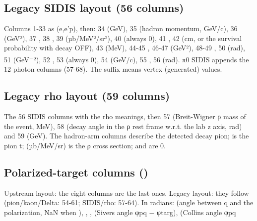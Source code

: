 \subsection{\texorpdfstring{Legacy SIDIS layout (56 columns)}{Legacy SIDIS layout (56 columns)}}\label{user_manual-07u5foutputs:716-legacy-sidis-layout-56-columns}
Columns 1-33 as (e,e'p), then: 34  (GeV), 35  (hadron momentum, GeV/c), 36  (GeV²), 37 , 38
, 39  (µb/\allowbreak{}MeV²/\allowbreak{}sr²),\allowbreak{} 40  (always 0), 41 , 42  (cm, or the survival probability
with decay OFF), 43  (MeV), 44-45 , 46-47  (GeV²), 48-49 , 50  (rad), 51 
(GeV\textsuperscript{−}²),\allowbreak{} 52 , 53  (always 0), 54  (GeV/c), 55 , 56  (rad). π0 SIDIS appends the 12 photon columns (57-68). The 
suffix means vertex (generated) values.

\subsection{\texorpdfstring{Legacy rho layout (59 columns)}{Legacy rho layout (59 columns)}}\label{user_manual-07u5foutputs:717-legacy-rho-layout-59-columns}
The 56 SIDIS columns with the rho meanings, then 57  (Breit-Wigner ρ mass of the event, MeV), 58  (decay
angle in the ρ rest frame w.r.t. the lab z axis, rad) and 59  (GeV). The hadron-arm columns describe the detected
decay pion;  is the pion t;  (µb/MeV/sr) is the ρ cross section;  and  are 0.

\subsection{\texorpdfstring{Polarized-target columns ()}{Polarized-target columns (using\_\allowbreak{}tgt\_\allowbreak{}field)}}\label{user_manual-07u5foutputs:718-polarized-target-columns-usingu5ftgtu5ffield}
Upstream layout: the eight columns are the last ones. Legacy layout: they follow  (pion/\allowbreak{}kaon/\allowbreak{}Delta: 54-61;
SIDIS/rho: 57-64). In radians:  (angle between q and the
polarization,\allowbreak{} NaN when ), , ,  (Sivers angle φpq − φtarg),  (Collins angle φpq

